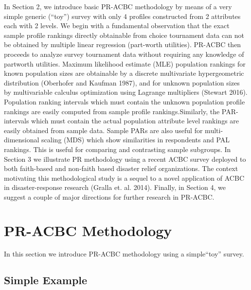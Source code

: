 \documentclass[a4paper, 12pt]{article}
\begin{document}
In Section 2, we introduce basic PR-ACBC methodology by means of a very simple generic (``toy'') survey with only 4 profiles constructed from 2 attributes each with 2 levels. We begin with a fundamental observation that the exact sample profile rankings directly obtainable from choice tournament data can not be obtained by multiple linear regression (part-worth utilities).  PR-ACBC then proceeds to analyze  survey tournament data without requiring any knowledge of partworth utilities.  Maximum likelihood estimate (MLE) population rankings for known population sizes are obtainable by a discrete multivariate hypergeometric distribution (Oberhofer and Kaufman 1987), and  for unknown population sizes by multivariable calculus optimization using Lagrange multipliers (Stewart 2016).   Population ranking intervals which must contain the unknown population profile rankings are easily computed from sample profile rankings.Similarly, the PAR-intervals which must contain the actual population attribute level rankings are easily obtained from sample data.   Sample PARs are also useful for multi-dimensional scaling (MDS) which show similarities in respondents and PAL rankings. This is useful for comparing and contrasting sample subgroups.  In Section 3 we illustrate PR methodology using a recent ACBC survey deployed to both faith-based and non-faith based disaster relief organizations.    The context motivating this methodological study is a sequel to a novel application of ACBC in disaster-response research (Gralla et. al. 2014). Finally, in Section 4, we suggest a couple of major directions for further research in PR-ACBC.



\section{PR-ACBC Methodology}
In this section we introduce PR-ACBC methodology using a simple``toy'' survey.

\subsection{Simple Example}
\end{document}
